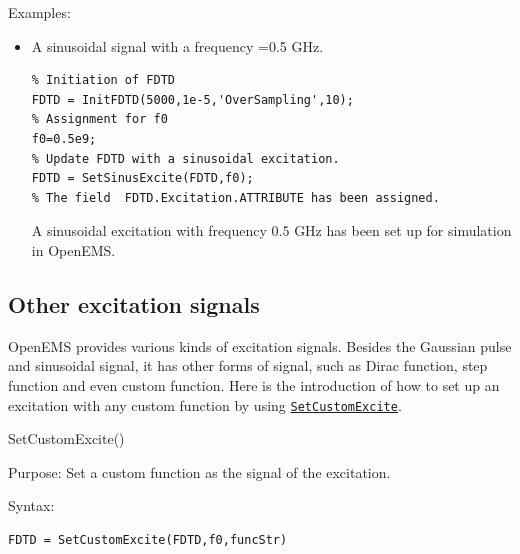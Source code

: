 \begin{FontDescr}{Examples:}
 \begin{itemize}
\item A sinusoidal signal with a  frequency =0.5 GHz.
\begin{lstlisting}
% Initiation of FDTD
FDTD = InitFDTD(5000,1e-5,'OverSampling',10);
% Assignment for f0
f0=0.5e9;
% Update FDTD with a sinusoidal excitation.
FDTD = SetSinusExcite(FDTD,f0);
% The field  FDTD.Excitation.ATTRIBUTE has been assigned.
\end{lstlisting}
A sinusoidal excitation with frequency $0.5$ GHz has been set up for simulation in OpenEMS.
\end{itemize}
\end{FontDescr}


    \subsection{Other excitation signals}\label{subsec:Other excitation signals}
OpenEMS provides various kinds of excitation signals. Besides the Gaussian pulse and sinusoidal signal, it has other forms of signal, such as Dirac function, step function and even custom function. Here is the introduction of how to set up an excitation with any custom function by using \hyperref[func:SetCustomExcite]{\texttt{SetCustomExcite}}.

\begin{FontNameFunct}{SetCustomExcite()}
 \label{func:SetCustomExcite}
\end{FontNameFunct}
	  
\begin{FontDescr}{Purpose:}
Set a custom function as the signal of the excitation.
\end{FontDescr}

\begin{FontDescr}{Syntax:}
      \begin{lstlisting}
FDTD = SetCustomExcite(FDTD,f0,funcStr)
      \end{lstlisting}
\end{FontDescr}
      
